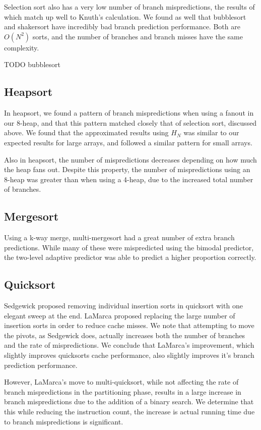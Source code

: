 Selection sort also has a very low number of branch mispredictions, the results
of which match up well to Knuth's calculation. We found as well that bubblesort
and shakersort have incredibly bad branch prediction performance. Both are
$O(N^2)$ sorts, and the number of branches and branch misses have the same
complexity.

TODO bubblesort

\subsection{Heapsort}
In heapsort, we found a pattern of branch mispredictions when using a fanout in
our 8-heap, and that this pattern matched closely that of selection sort,
discussed above. We found that the approximated results using $H_N$ was similar to
our expected results for large arrays, and followed a similar pattern for small
arrays.

Also in heapsort, the number of mispredictions decreases depending on how much
the heap fans out. Despite this property, the number of mispredictions using an
8-heap was greater than when using a 4-heap, due to the increased total number
of branches.

\subsection{Mergesort}

Using a k-way merge, multi-mergesort had a great number of extra branch
predictions. While many of these were mispredicted using the bimodal predictor,
the two-level adaptive predictor was able to predict a higher
proportion correctly.

\subsection{Quicksort}

Sedgewick proposed removing individual insertion sorts in quicksort with one
elegant sweep at the end. LaMarca proposed replacing the large number of
insertion sorts in order to reduce cache misses. We note that attempting to move
the pivots, as Sedgewick does, actually increases both the number of branches
and the rate of mispredictions. We conclude that LaMarca's improvement, which
slightly improves quicksorts cache performance, also slightly improves it's
branch prediction performance.

However, LaMarca's move to multi-quicksort, while not affecting the rate of
branch mispredictions in the partitioning phase, results in a large increase in
branch mispredictions due to the addition of a binary search. We determine that
this while reducing the instruction count, the increase is actual running time
due to branch mispredictions is significant.

